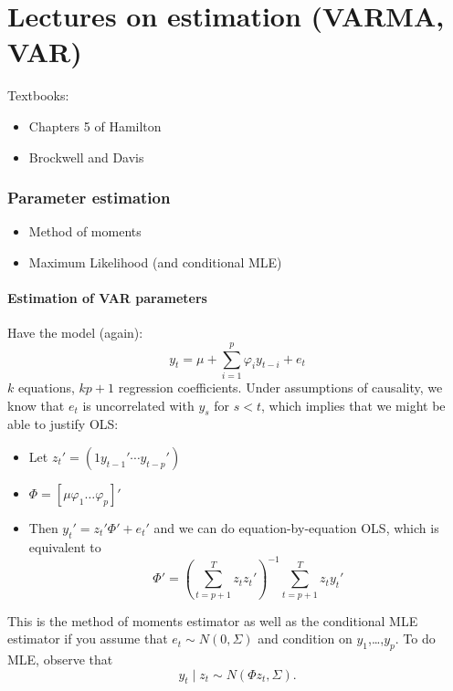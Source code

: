 
\part{Lectures on estimation (VARMA, VAR)}

Textbooks:
\begin{itemize}
\item Chapters 5 of Hamilton
\item Brockwell and Davis
\end{itemize}

\section{Parameter estimation}

\begin{itemize}
\item Method of moments
\item Maximum Likelihood (and conditional MLE)
\end{itemize}

\subsection{Estimation of VAR parameters}

Have the model (again):
\[y_t = μ + ∑_{i=1}^p φ_i y_{t-i} + e_t\] $k$ equations, $k p + 1$
regression coefficients. Under assumptions of causality, we know that
$e_t$ is uncorrelated with $y_s$ for $s < t$, which implies that we
might be able to justify OLS:
\begin{itemize}
\item Let $z_t' = (1 y_{t-1}' ⋯ y_{t-p}')$
\item $Φ = [ μ φ_1 … φ_p ]'$
\item Then $y_t' = z_t'Φ' + e_t'$ and we can do equation-by-equation
  OLS, which is equivalent to
  \[\hat Φ' = (∑_{t=p+1}^T z_t z_t')^{-1} ∑_{t=p+1}^T z_t y_t'\]
\end{itemize}

This is the method of moments estimator as well as the conditional MLE
estimator if you assume that $e_t ∼ N(0, Σ)$ and
condition on $y_1$,…,$y_p$. To do MLE, observe that
\[y_t ∣ z_t ∼ N(Φ z_t, Σ).\]


